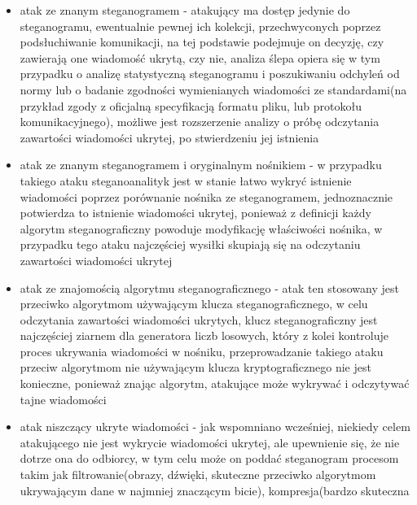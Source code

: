 \documentclass[a4paper, twoside, 12pt]{report}
\begin{document}
        \begin{itemize}
            \item atak ze znanym steganogramem - atakujący ma dostęp jedynie do
                steganogramu, ewentualnie pewnej ich kolekcji, przechwyconych poprzez
                podsłuchiwanie komunikacji, na tej podstawie podejmuje on decyzję,
                czy zawierają one wiadomość ukrytą, czy nie, analiza ślepa opiera
                się w tym przypadku o analizę statystyczną steganogramu i poszukiwaniu
                odchyleń od normy lub o badanie zgodności wymienianych wiadomości
                ze standardami(na przykład zgody z oficjalną specyfikacją formatu pliku,
                lub protokołu komunikacyjnego), możliwe jest rozszerzenie
                analizy o próbę odczytania zawartości wiadomości ukrytej, po stwierdzeniu
                jej istnienia
            \item atak ze znanym steganogramem i oryginalnym nośnikiem - w przypadku
                takiego ataku steganoanalityk jest w stanie łatwo wykryć istnienie
                wiadomości poprzez porównanie nośnika ze steganogramem, jednoznacznie
                potwierdza to istnienie wiadomości ukrytej, ponieważ z definicji
                każdy algorytm steganograficzny powoduje modyfikację właściwości
                nośnika, w przypadku tego ataku najczęściej wysiłki skupiają się
                na odczytaniu zawartości wiadomości ukrytej
            \item atak ze znajomością algorytmu steganograficznego - atak ten
                stosowany jest przeciwko algorytmom używającym klucza steganograficznego,
                w celu odczytania zawartości wiadomości ukrytych, klucz steganograficzny
                jest najczęściej ziarnem dla generatora liczb losowych, który z
                kolei kontroluje proces ukrywania wiadomości w nośniku, przeprowadzanie
                takiego ataku przeciw algorytmom nie używającym klucza kryptograficznego
                nie jest konieczne, ponieważ znając algorytm, atakujące może wykrywać i
                odczytywać tajne wiadomości
            \item atak niszczący ukryte wiadomości - jak wspomniano wcześniej, niekiedy
                celem atakującego nie jest wykrycie wiadomości ukrytej, ale upewnienie
                się, że nie dotrze ona do odbiorcy, w tym celu może on poddać steganogram
                procesom takim jak filtrowanie(obrazy, dźwięki, skuteczne przeciwko
                algorytmom ukrywającym dane w najmniej znaczącym bicie), kompresja(bardzo skuteczna

\end{itemize}
\end{document}
